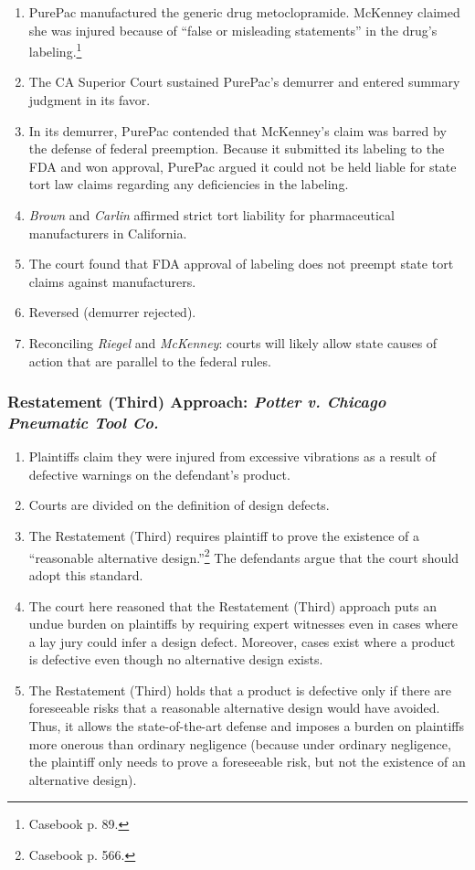 \begin{enumerate}
    \item PurePac manufactured the generic drug metoclopramide. McKenney claimed 
    she was injured because of ``false or misleading statements'' in the drug's 
    labeling.\footnote{Casebook p. 89.}
    \item The CA Superior Court sustained PurePac's demurrer and entered summary 
    judgment in its favor.
    \item In its demurrer, PurePac contended that McKenney's claim was barred by 
    the defense of federal preemption. Because it submitted its labeling to the 
    FDA and won approval, PurePac argued it could not be held liable for state 
    tort law claims regarding any deficiencies in the labeling.
    \item \emph{Brown} and \emph{Carlin} affirmed strict tort liability for 
    pharmaceutical manufacturers in California.
    \item The court found that FDA approval of labeling does not preempt state 
    tort claims against manufacturers.
    \item Reversed (demurrer rejected).
    \item Reconciling \emph{Riegel} and \emph{McKenney}: courts will likely 
    allow state causes of action that are parallel to the federal rules.
\end{enumerate}


\subsubsection{Restatement (Third) Approach: \emph{Potter v. Chicago Pneumatic 
Tool Co.}}

\begin{enumerate}
    \item Plaintiffs claim they were injured from excessive vibrations as a 
    result of defective warnings on the defendant's product.
    \item Courts are divided on the definition of design defects.
    \item The Restatement (Third) requires plaintiff to prove the existence of a 
    ``reasonable alternative design.''\footnote{Casebook p. 566.} The defendants 
    argue that the court should adopt this standard.
    \item The court here reasoned that the Restatement (Third) approach puts an 
    undue burden on plaintiffs by requiring expert witnesses even in cases where 
    a lay jury could infer a design defect. Moreover, cases exist where a 
    product is defective even though no alternative design exists.
    \item The Restatement (Third) holds that a product is defective only if 
    there are foreseeable risks that a reasonable alternative design would have 
    avoided. Thus, it allows the state-of-the-art defense and imposes a burden 
    on plaintiffs more onerous than ordinary negligence (because under ordinary 
    negligence, the plaintiff only needs to prove a foreseeable risk, but not 
    the existence of an alternative design).
\end{enumerate}

